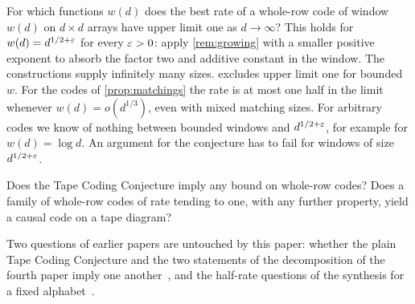\begin{problem}\label{prob:growing}
For which functions $w(d)$ does the best rate of a whole-row code of window $w(d)$ on $d\times d$ arrays have upper
limit one as $d\to\infty$? This holds for $w(d)=d^{1/2+\varepsilon}$ for every $\varepsilon>0$: apply \cref{rem:growing} with
a smaller positive exponent to absorb the factor two and additive constant in the window. The constructions supply infinitely many
sizes.  excludes upper limit one for bounded~$w$. For
the codes of \cref{prop:matchings} the rate is at most one half in the limit whenever $w(d)=o(d^{1/3})$, even
with mixed matching sizes. For arbitrary codes we know of nothing between bounded
windows and $d^{1/2+\varepsilon}$, for example for $w(d)=\log d$. An argument for the conjecture has to fail for windows of
size $d^{1/2+\varepsilon}$.
\end{problem}

\begin{problem}[Converse]\label{prob:converse}
Does the Tape Coding Conjecture imply any bound on whole-row codes? Does a family of whole-row codes of rate tending
to one, with any further property, yield a causal code on a tape diagram?
\end{problem}
Two questions of earlier papers are untouched by this paper: whether the plain Tape Coding Conjecture and the two
statements of the decomposition of the fourth paper imply one another~\cite[Remark~4.12]{FourthPaper2026}, and the
half-rate questions of the synthesis for a fixed alphabet~\cite[Problem~9.4]{SeventeenthPaper2026}.
